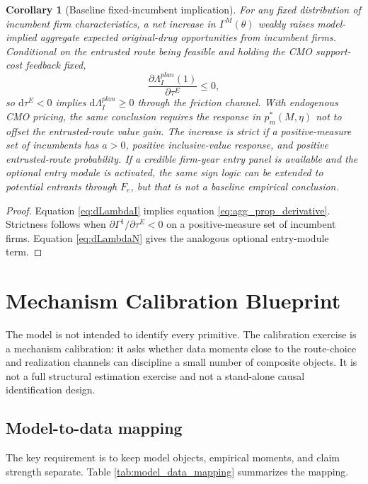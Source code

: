 \documentclass[12pt]{article}
\newtheorem{corollary}{Corollary}
\newcommand{\1}{\mathbf{1}}
\newcommand{\dd}{\mathrm{d}}
\begin{document}
\begin{corollary}[Baseline fixed-incumbent implication]
For any fixed distribution of incumbent firm characteristics, a net increase in $\Gamma^M(\theta)$ weakly raises model-implied aggregate expected original-drug opportunities from incumbent firms. Conditional on the entrusted route being feasible and holding the CMO support-cost feedback fixed,
\begin{equation}
    \frac{\partial \Lambda_I^{plan}(1)}{\partial\tau^E}\le0,
    \label{eq:agg_prop_derivative}
\end{equation}
so $\dd\tau^E<0$ implies $\dd\Lambda_I^{plan}\ge0$ through the friction channel. With endogenous CMO pricing, the same conclusion requires the response in $p_m^*(M,\eta)$ not to offset the entrusted-route value gain. The increase is strict if a positive-measure set of incumbents has $a>0$, positive inclusive-value response, and positive entrusted-route probability. If a credible firm-year entry panel is available and the optional entry module is activated, the same sign logic can be extended to potential entrants through $F_e$, but that is not a baseline empirical conclusion.
\end{corollary}

\begin{proof}
Equation \eqref{eq:dLambdaI} implies equation \eqref{eq:agg_prop_derivative}. Strictness follows when $\partial\Gamma^1/\partial\tau^E<0$ on a positive-measure set of incumbent firms. Equation \eqref{eq:dLambdaN} gives the analogous optional entry-module term.
\end{proof}

\section{Mechanism Calibration Blueprint}
\label{sec:mechanism_calibration_blueprint}

The model is not intended to identify every primitive. The calibration exercise is a mechanism calibration: it asks whether data moments close to the route-choice and realization channels can discipline a small number of composite objects. It is not a full structural estimation exercise and not a stand-alone causal identification design.

\subsection{Model-to-data mapping}

The key requirement is to keep model objects, empirical moments, and claim strength separate. Table \ref{tab:model_data_mapping} summarizes the mapping.
\end{document}
